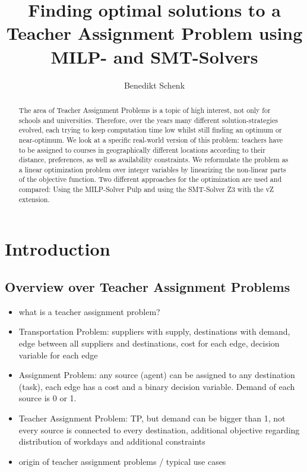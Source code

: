 \documentclass[]{article}
\title{Finding optimal solutions to a Teacher Assignment Problem using MILP- and SMT-Solvers}
\author{Benedikt Schenk}
\begin{document}
\maketitle

\begin{abstract}
	
	The area of Teacher Assignment Problems is a topic of high interest, not only for schools and universities. Therefore, over the years many different solution-strategies evolved, each trying to keep computation time low whilst still finding an optimum or near-optimum. We look at a specific real-world version of this problem: teachers have to be assigned to courses in geographically different locations according to their distance, preferences, as well as availability constraints. We reformulate the problem as a linear optimization problem over integer variables by linearizing the non-linear parts of the objective function. Two different approaches for the optimization are used and compared: Using the MILP-Solver Pulp and using the SMT-Solver Z3 with the vZ extension.

\end{abstract}

\pagebreak


\tableofcontents

\pagebreak

\section{Introduction}
\subsection{Overview over Teacher Assignment Problems}
\begin{itemize}
	\item what is a teacher assignment problem? 

	\item Transportation Problem: suppliers with supply, destinations with demand, edge between all suppliers and destinations, cost for each edge, decision variable for each edge
	\item Assignment Problem: any source (agent) can be assigned to any destination (task), each edge has a cost and a binary decision variable. Demand of each source is 0 or 1.
	\item Teacher Assignment Problem: TP, but demand can be bigger than 1, not every source is connected to every destination, additional objective regarding distribution of workdays and additional constraints
	\item origin of teacher assignment problems / typical use cases
\end{itemize}
\end{document}
